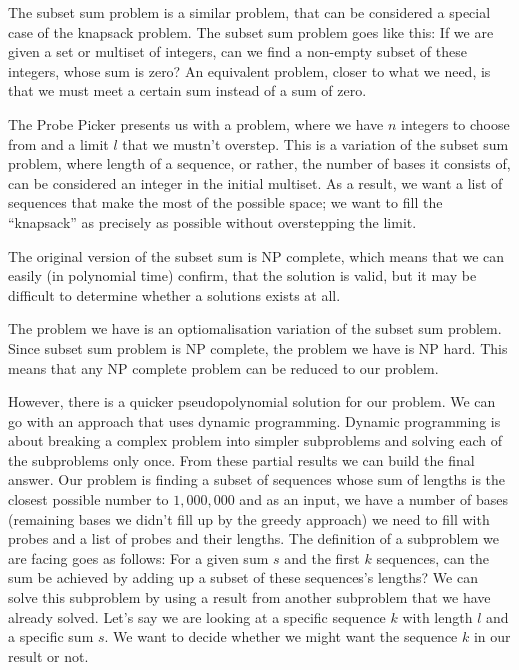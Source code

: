 The subset sum problem is a similar problem, that can be considered a special case of the knapsack problem. The subset sum problem goes like this: If we are given a set or multiset 
of integers, can we find a non-empty subset of these integers, whose sum is zero? An equivalent problem, closer to what we need, is that we must meet a certain sum instead of a sum of 
zero. 

The Probe Picker presents us with a problem, where we have $n$ integers to choose from and a limit $l$ that we mustn't overstep. This is a variation of the subset sum problem, 
where length of a sequence, or rather, the number of bases it consists of, can be considered an integer in the initial multiset. As a result, we want a list of sequences that make the 
most of the possible space; we want to fill the ``knapsack'' as precisely as possible without overstepping the limit. 

The original version of the subset sum is NP complete, which means that we can easily (in polynomial time) confirm, that the solution is valid, but it may be difficult to determine whether a 
solutions exists at all. 

The problem we have is an optiomalisation variation of the subset sum problem. Since subset sum problem is NP complete, the problem we have is NP hard. This means that any NP complete problem can be 
reduced to our problem. 

However, there is a quicker pseudopolynomial solution for our problem. We can go with an approach that uses dynamic programming. 
Dynamic programming is about breaking a complex problem into simpler subproblems and solving each of the subproblems only once. From these partial results we can build the final answer. 
Our problem is finding a subset of sequences whose sum of lengths is the closest possible number to $1,000,000$ and as an input, we have a number of bases (remaining bases we didn't fill up by the greedy 
approach) we need to fill with probes and a list of probes and their lengths. 
The definition of a subproblem we are facing goes as follows: 
For a given sum $s$ and the first $k$ sequences, can the sum be achieved by adding up a subset of these sequences's lengths? 
We can solve this subproblem by using a result from another subproblem that we have already solved. 
Let's say we are looking at a specific sequence $k$ with length $l$ and a specific sum $s$. We want to decide whether we might want the sequence $k$ in our result or not. 

